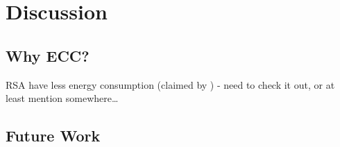 \chapter{Discussion}

\section{Why ECC?}
RSA have less energy consumption (claimed by \cite{hosseinisecure}) - need to
check it out, or at least mention somewhere\ldots

\section{Future Work}